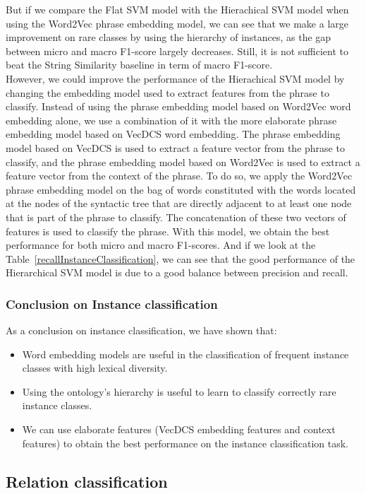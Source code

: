 \documentclass[twocolumn]{article}
\begin{document}
But if we compare the Flat SVM model with the Hierachical SVM model when using the Word2Vec phrase embedding model, we can see that we make a large improvement on rare classes by using the hierarchy of instances, as the gap between micro and macro F1-score largely decreases. Still, it is not sufficient to beat the String Similarity baseline in term of macro F1-score.\\
However, we could improve the performance of the Hierachical SVM model by changing the embedding model used to extract features from the phrase to classify. Instead of using the phrase embedding model based on Word2Vec word embedding alone, we use a combination of it with the more elaborate phrase embedding model based on VecDCS word embedding. The phrase embedding model based on VecDCS is used to extract a feature vector from the phrase to classify, and the phrase embedding model based on Word2Vec is used to extract a feature vector from the context of the phrase. To do so, we apply the Word2Vec phrase embedding model on the bag of words constituted with the words located at the nodes of the syntactic tree that are directly adjacent to at least one node that is part of the phrase to classify. The concatenation of these two vectors of features is used to classify the phrase. With this model, we obtain the best performance for both micro and macro F1-scores. And if we look at the Table~\ref{recallInstanceClassification}, we can see that the good performance of the Hierarchical SVM model is due to a good balance between precision and recall.

\subsubsection{Conclusion on Instance classification}

As a conclusion on instance classification, we have shown that:
\begin{itemize}
\item Word embedding models are useful in the classification of frequent instance classes with high lexical diversity.
\item Using the ontology's hierarchy is useful to learn to classify correctly rare instance classes.
\item We can use elaborate features (VecDCS embedding features and context features) to obtain the best performance on the instance classification task.
\end{itemize}

\subsection{Relation classification}
\end{document}
